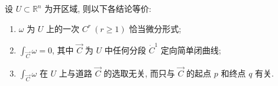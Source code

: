 \begin{theorem}\label{thm:11.5.2}

设 $U\subset\mathbb{R}^{n}$ 为开区域, 则以下各结论等价:

\begin{enumerate}[label=(\arabic*),leftmargin=2.6em,itemsep=0.1\baselineskip,topsep=0.1\baselineskip]

\item $\omega$ 为 $U$ 上的一次 $C^{r}\ (r\geqslant1)$ 恰当微分形式;

\item $\displaystyle\int_{\overrightarrow{C}}\omega=0$, 其中 $\overrightarrow{C}$ 为 $U$ 中任何分段 $\dot{C}^{1}$ 定向简单闭曲线;

\item $\displaystyle\int_{\overrightarrow{C}}\omega$ 在 $U$ 上与道路 $\overrightarrow{C}$ 的选取无关, 而只与 $\overrightarrow{C}$ 的起点 $p$ 和终点 $q$ 有关.

\end{enumerate}

\end{theorem}

